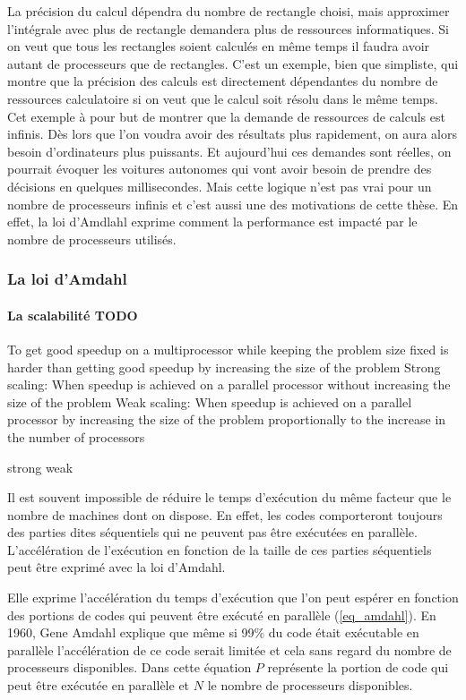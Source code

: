 La précision du calcul dépendra du nombre de rectangle choisi, mais approximer l'intégrale avec plus de rectangle demandera plus de ressources informatiques. Si on veut que tous les rectangles soient calculés en même temps il faudra avoir autant de processeurs que de rectangles. C'est un exemple, bien que simpliste, qui montre que la précision des calculs est directement dépendantes du nombre de ressources calculatoire si on veut que le calcul soit résolu dans le même temps. Cet exemple à pour but de montrer que la demande de ressources de calculs est infinis. Dès lors que l'on voudra avoir des résultats plus rapidement, on aura alors besoin d'ordinateurs plus puissants. Et aujourd'hui ces demandes sont réelles, on pourrait évoquer les voitures autonomes qui vont avoir besoin de prendre des décisions en quelques millisecondes. Mais cette logique n'est pas vrai pour un nombre de processeurs infinis et c'est aussi une des motivations de cette thèse. En effet, la loi d'Amdlahl exprime comment la performance est impacté par le nombre de processeurs utilisés.
 



\subsubsection{La loi d'Amdahl} 

\paragraph{La scalabilité TODO}
To get good speedup on a multiprocessor while keeping the problem size fixed is harder than getting good speedup by increasing the size of the problem
Strong scaling:  When speedup is achieved on a parallel processor without increasing the size of the problem
Weak scaling:  When speedup is achieved on a parallel processor by increasing the size of the problem proportionally to the increase in the number of processors

strong
weak

 Il est  souvent impossible de réduire le temps d'exécution du même facteur que le nombre de machines dont on dispose. En effet, les codes comporteront toujours des parties dites séquentiels qui ne peuvent pas être exécutées en parallèle. L'accélération de l'exécution en fonction de la taille de ces parties séquentiels peut être exprimé avec la loi d'Amdahl.

Elle exprime l'accélération du temps d'exécution que l'on peut espérer en fonction des portions de codes qui peuvent être exécuté en parallèle (\autoref{eq_amdahl}). En 1960, Gene Amdahl explique que même si 99\% du code était exécutable en parallèle l'accélération de ce code serait limitée et cela sans regard du nombre de processeurs disponibles. Dans cette équation $P$ représente la portion de code qui peut être exécutée en parallèle et $N$ le nombre de processeurs disponibles.

